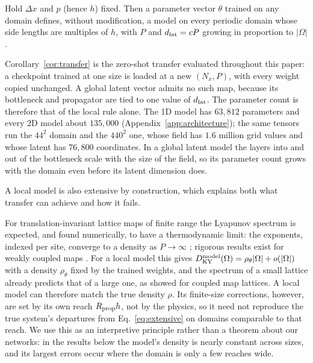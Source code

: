 \begin{corollary}
\label{cor:transfer}
Hold $\Delta x$ and $p$ (hence $h$) fixed. Then a parameter vector
$\theta$ trained on any domain defines, without modification, a model on
every periodic domain whose side lengths are multiples of $h$, with
$P$ and $d_{\mathrm{lat}}=cP$ growing in proportion to $|\Omega|$.
\end{corollary}

Corollary~\ref{cor:transfer} is the zero-shot transfer evaluated
throughout this paper: a checkpoint trained at one size is loaded at a
new $(N_x,P)$, with every weight copied unchanged. A global latent vector
admits no such map, because its bottleneck and propagator are tied to
one value of $d_{\mathrm{lat}}$.
The parameter count is therefore that of the local rule alone. The 1D
model has $63{,}812$ parameters and every 2D model about $135{,}000$
(Appendix~\ref{app:architecture}); the same tensors run the $44^2$ domain and
the $440^2$ one, whose field has $1.6$ million grid values and whose latent
has $76{,}800$ coordinates. In a global latent model the layers into and out
of the bottleneck scale with the size of the field, so its parameter count
grows with the domain even before its latent dimension does.

A local model is also extensive by construction, which explains both
what transfer can achieve and how it fails.

\begin{remark}
\label{rem:extensive_model}
For translation-invariant lattice maps of finite range the Lyapunov
spectrum is expected, and found numerically, to have a thermodynamic
limit: the exponents, indexed per site, converge to a density as
$P\to\infty$
\citep{ruelle1982,livi1986,isola1990}; rigorous results exist for weakly
coupled maps \citep{bunimovichsinai1988}. For a local model this gives
$D_{\mathrm{KY}}^{\text{model}}(\Omega) = \rho_\theta|\Omega| + o(|\Omega|)$ with a
density $\rho_\theta$ fixed by the trained weights, and the spectrum of a
small lattice already predicts that of a large one, as
\citet{carretero1999} showed for coupled map lattices. A local model can
therefore match the true density $\rho$. Its finite-size corrections,
however, are set by its own reach $R_{\mathrm{prop}} h$, not by the physics, so it
need not reproduce the true system's departures from
Eq.~\eqref{eq:extensive} on domains comparable to that reach. We use this
as an interpretive principle rather than a theorem about our networks: in
the results below the model's density is nearly constant across sizes,
and its largest errors occur where the domain is only a few reaches
wide.
\end{remark}

